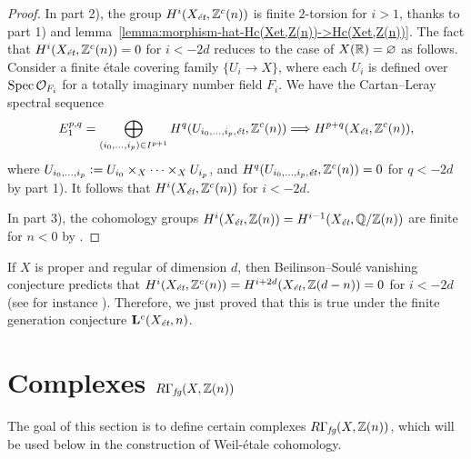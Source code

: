 \documentclass{article}
\numberwithin{equation}{section}
\begin{document}
\begin{proposition}
\begin{proof}
    In part 2), the group $H^i (X_\et, \ZZ^c (n))$ is finite $2$-torsion for
    $i > 1$, thanks to part 1) and
    lemma~\ref{lemma:morphism-hat-Hc(Xet,Z(n))->Hc(Xet,Z(n))}. The fact that
    $H^i (X_\et, \ZZ^c (n)) = 0$ for $i < -2d$ reduces to the case of
    $X (\RR) = \emptyset$ as follows. Consider a finite étale covering family
    $\{ U_i \to X \}$, where each $U_i$ is defined over
    $\Spec \mathcal{O}_{F_i}$ for a totally imaginary number field $F_i$.
    We have the Cartan--Leray spectral sequence
    \[ E_1^{p,q} = \bigoplus_{(i_0,\ldots,i_p) \in I^{p+1}} H^q (U_{i_0,\ldots,i_p, \et}, \ZZ^c (n))
      \Longrightarrow H^{p+q} (X_\et, \ZZ^c (n)), \]
    where $U_{i_0,\ldots,i_p} \dfn U_{i_0} \times_X \cdots \times_X U_{i_p}$, and
    $H^q (U_{i_0,\ldots,i_p, \et}, \ZZ^c (n)) = 0$ for $q < -2d$ by part 1).
    It follows that $H^i (X_\et, \ZZ^c (n))$ for $i < -2d$.

    In part 3), the cohomology groups
    $H^i (X_\et, \ZZ (n)) = H^{i-1} (X_\et, \QQ/\ZZ (n))$ are finite for $n < 0$
    by \cite[Theorem~3]{Kahn-2003}.
  \end{proof}
\end{proposition}

\begin{remark}
  If $X$ is proper and regular of dimension $d$, then Beilinson--Soulé
  vanishing conjecture predicts that
  $H^i (X_\et, \ZZ^c (n)) = H^{i+2d} (X_\et, \ZZ (d-n)) = 0$ for $i < -2d$
  (see for instance \cite[\S 4.3.4]{Kahn-2005}). Therefore, we just proved that
  this is true under the finite generation conjecture $\mathbf{L}^c (X_\et, n)$.
\end{remark}


\section{Complexes \texorpdfstring{$R\Gamma_\fg (X, \ZZ(n))$}{RΓ\_fg (X, ℤ(n))}}
\label{sec:RGamma-fg}

The goal of this section is to define certain complexes
$R\Gamma_\fg (X, \ZZ(n))$, which will be used below in the construction of
Weil-étale cohomology.
\end{document}
